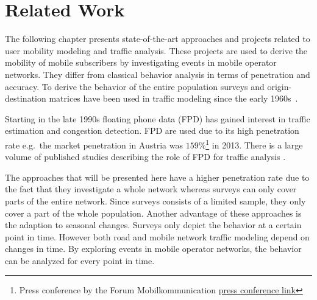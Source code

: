 \chapter{Related Work}
The following chapter presents state-of-the-art approaches and projects related to user mobility modeling and traffic analysis. These projects are used to derive the mobility of mobile subscribers by investigating events in mobile operator networks. They differ from classical behavior analysis in terms of penetration and accuracy. To derive the behavior of the entire population surveys and origin-destination matrices have been used in traffic modeling since the early 1960s~\cite{Beckmann,Heanue1966,Voorhees}.

Starting in the late 1990s floating phone data (FPD) has gained interest in traffic estimation and congestion detection. FPD are used due to its high penetration rate e.g.\, the market penetration in Austria was $159\%$\footnote{Press conference by the Forum Mobilkommunication \href{http://www.fmk.at/Medien/Pressekonferenzen/FMK-Jahrespressekonferenz-2012}{press conference link}} in 2013. There is a large volume of published studies describing the role of FPD for traffic analysis \cite{Yim2001,Qiu2007,Caceres2008}.

The approaches that will be presented here have a higher penetration rate due to the fact that they investigate a whole network whereas surveys can only cover parts of the entire network. Since surveys consists of a limited sample, they only cover a part of the whole population. Another advantage of these approaches is the adaption to seasonal changes. Surveys only depict the behavior at a certain point in time. However both road and mobile network traffic modeling depend on changes in time. By exploring events in mobile operator networks, the behavior can be analyzed for every point in time.

